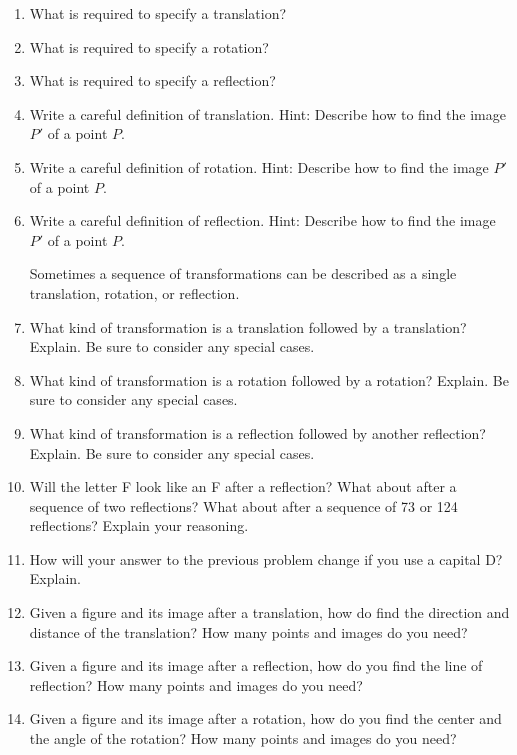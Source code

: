 \begin{problems}
\begin{enumerate}

\item What is required to specify a translation?  
\item What is required to specify a rotation? 
\item What is required to specify a reflection?  
\item Write a careful definition of translation. Hint: Describe how to find the image $P'$ of a point $P$.  
\item Write a careful definition of rotation. Hint: Describe how to find the image $P'$ of a point $P$.  
\item Write a careful definition of reflection. Hint: Describe how to find the image $P'$ of a point $P$.

Sometimes a sequence of transformations can be described as a single translation, rotation, or reflection.  

\item What kind of transformation is a translation followed by a translation?  Explain.  Be sure to consider any special cases.  
\item What kind of transformation is a rotation followed by a rotation?  Explain.  Be sure to consider any special cases.   
\item What kind of transformation is a reflection followed by another reflection?  Explain.  Be sure to consider any special cases.  

\item Will the letter F look like an F after a reflection?  What about after a sequence of two reflections?  What about after a sequence of 73 or 124 reflections?  Explain your reasoning.  

\item How will your answer to the previous problem change if you use a capital D?  Explain.  

\item Given a figure and its image after a translation, how do find the direction and distance of the translation?    How many points and images do you need?  
\item Given a figure and its image after a reflection, how do you find the line of reflection?  How many points and images do you need?  
\item Given a figure and its image after a rotation, how do you find the center and the angle of the rotation?  How many points and images do you need?  


\end{enumerate}
\end{problems}
